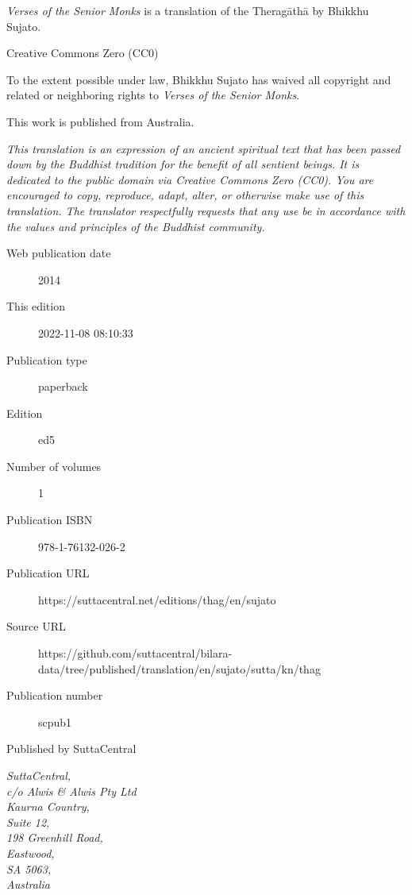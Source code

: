 \documentclass[12pt,openany]{book}%
\begin{document}
\begin{footnotesize}

\textit{Verses of the Senior Monks} is a translation of the Theragāthā by Bhikkhu Sujato.

\medskip

Creative Commons Zero (CC0)

To the extent possible under law, Bhikkhu Sujato has waived all copyright and related or neighboring rights to \textit{Verses of the Senior Monks}.

\medskip

This work is published from Australia.

\begin{center}
\textit{This translation is an expression of an ancient spiritual text that has been passed down by the Buddhist tradition for the benefit of all sentient beings. It is dedicated to the public domain via Creative Commons Zero (CC0). You are encouraged to copy, reproduce, adapt, alter, or otherwise make use of this translation. The translator respectfully requests that any use be in accordance with the values and principles of the Buddhist community.}
\end{center}

\medskip

\begin{description}
    \item[Web publication date] 2014
    \item[This edition] 2022-11-08 08:10:33
    \item[Publication type] paperback
    \item[Edition] ed5
    \item[Number of volumes] 1
    \item[Publication ISBN] 978-1-76132-026-2
    \item[Publication URL] https://suttacentral.net/editions/thag/en/sujato
    \item[Source URL] https://github.com/suttacentral/bilara-data/tree/published/translation/en/sujato/sutta/kn/thag
    \item[Publication number] scpub1
\end{description}

\medskip

Published by SuttaCentral

\medskip

\textit{SuttaCentral,\\
c/o Alwis \& Alwis Pty Ltd\\
Kaurna Country,\\
Suite 12,\\
198 Greenhill Road,\\
Eastwood,\\
SA 5063,\\
Australia}

\end{footnotesize}
\end{document}
